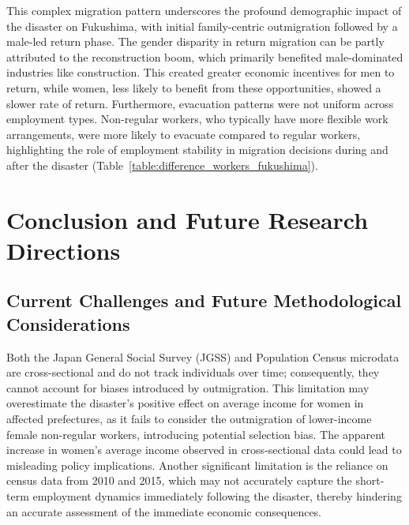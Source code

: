 \documentclass[a4paper,12pt]{article}
\begin{document}
This complex migration pattern underscores the profound demographic impact of the disaster on Fukushima, with initial family-centric outmigration followed by a male-led return phase. The gender disparity in return migration can be partly attributed to the reconstruction boom, which primarily benefited male-dominated industries like construction. This created greater economic incentives for men to return, while women, less likely to benefit from these opportunities, showed a slower rate of return. Furthermore, evacuation patterns were not uniform across employment types. Non-regular workers, who typically have more flexible work arrangements, were more likely to evacuate compared to regular workers, highlighting the role of employment stability in migration decisions during and after the disaster (Table~\ref{table:difference_workers_fukushima}).

\section{Conclusion and Future Research Directions}

\subsection{Current Challenges and Future Methodological Considerations}

Both the Japan General Social Survey (JGSS) and Population Census microdata are cross-sectional and do not track individuals over time; consequently, they cannot account for biases introduced by outmigration. This limitation may overestimate the disaster's positive effect on average income for women in affected prefectures, as it fails to consider the outmigration of lower-income female non-regular workers, introducing potential selection bias. The apparent increase in women's average income observed in cross-sectional data could lead to misleading policy implications. Another significant limitation is the reliance on census data from 2010 and 2015, which may not accurately capture the short-term employment dynamics immediately following the disaster, thereby hindering an accurate assessment of the immediate economic consequences.
\end{document}
